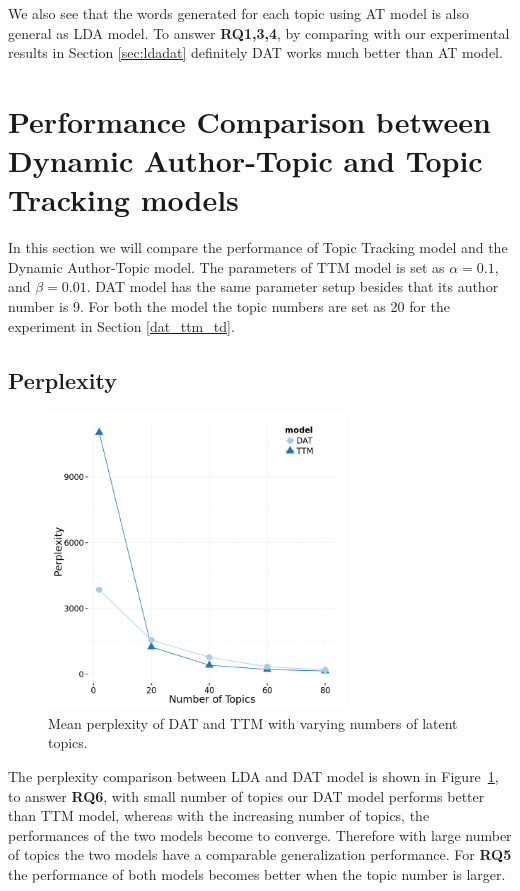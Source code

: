 We also see that the words generated for each topic using AT model is also general as LDA model. To answer \textbf{RQ1,3,4}, by comparing with our experimental results in Section \ref{sec:ldadat} definitely DAT works much better than AT model.


\section{Performance Comparison between Dynamic Author-Topic and Topic Tracking models}
In this section we will compare the performance of Topic Tracking model and the Dynamic Author-Topic model. The parameters of TTM model is set as $\alpha = 0.1$, and $\beta = 0.01$. DAT model has the same parameter setup besides that its author number is 9. For both the model the topic numbers are set as 20 for the experiment in Section \ref{dat_ttm_td}.
\subsection{Perplexity}
\begin{figure}[h]
\centering
\includegraphics[width=0.7\textwidth]{figures/ttm_data_perplexity.png}
\caption{Mean perplexity of DAT and TTM with varying numbers of latent topics.}
\label{fig:ttm_dat_perplexity}
\end{figure}

The perplexity comparison between LDA and DAT model is shown in Figure~\ref{fig:ttm_dat_perplexity}, to answer \textbf{RQ6}, with small number of topics our DAT model performs better than TTM model, whereas with the increasing number of topics, the performances of the two models become to converge. Therefore with large number of topics the two models have a comparable generalization performance. For \textbf{RQ5} the performance of both models becomes better when the topic number is larger.


